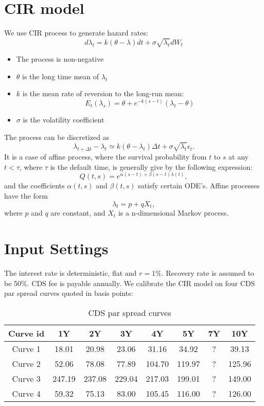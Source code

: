 \documentclass[a4paper,twoside,10pt]{report}
\begin{document}
\chapter{CIR model}
We use CIR process to generate hazard rates: \[ d\lambda_t = k(\theta - \lambda)dt + \sigma \sqrt{\lambda_t} dW_t\]
\begin{itemize}
  \item The process is non-negative
  \item $\theta$ is the long time mean of $\lambda_t$
	\item $k$ is the mean rate of reversion to the long-run mean: \[ E_t(\lambda_s)= \theta + e^{-k(s-t)}(\lambda_t - \theta)\]
	\item $\sigma$ is the volatility coefficient
\end{itemize}
The process can be discretized as \[ \lambda_{t+\Delta t} - \lambda_t \simeq k(\theta - \lambda_t)\Delta t + \sigma \sqrt{\lambda_t}\epsilon_t.\]
It is a case of affine process, where the survival probability from $t$ to $s$ at any $t < \tau$, where $\tau$ is the default time, is generally give by the following expression: \[ Q(t,s) = e^{\alpha(s-t) + \beta(s-t)\lambda(t)},\] and the coefficients $\alpha(t,s)$ and $\beta(t,s)$ satisfy certain ODE's. Affine processes have the form \[ \lambda_t = p + q X_t, \] where $p$ and $q$ are constant, and $X_t$ is a n-dimensional Markov process. 

\chapter{Input Settings}
The interest rate is deterministic, flat and $r = 1\%$. Recovery rate is assumed to be 50\%. CDS fee is payable annually. We calibrate the CIR model on four CDS par spread curves quoted in basis points: 
\begin{table}[h!]
\centering
\begin{tabular}{ |c|c|c|c|c|c|c|c| } 
 \hline
  Curve id & 1Y & 2Y & 3Y & 4Y & 5Y & 7Y & 10Y \\ 
 \hline
	Curve 1  & 18.01 & 20.98 & 23.06 & 31.16 & 34.92 & ? &39.13 \\ 
 \hline
  Curve 2  & 52.06 & 78.08 & 77.89 & 104.70 & 119.97 & ? &125.96 \\ 
 \hline
	Curve 3  & 247.19 & 237.08 & 229.04 & 217.03 & 199.01 & ? & 149.00 \\ 
 \hline
	Curve 4  & 59.32 & 75.13 & 83.00 & 105.45 & 116.00 & ? & 126.00 \\ 
 \hline
\end{tabular}
\caption{CDS par spread curves}
\label{spread_curve}
\end{table}
\end{document}
